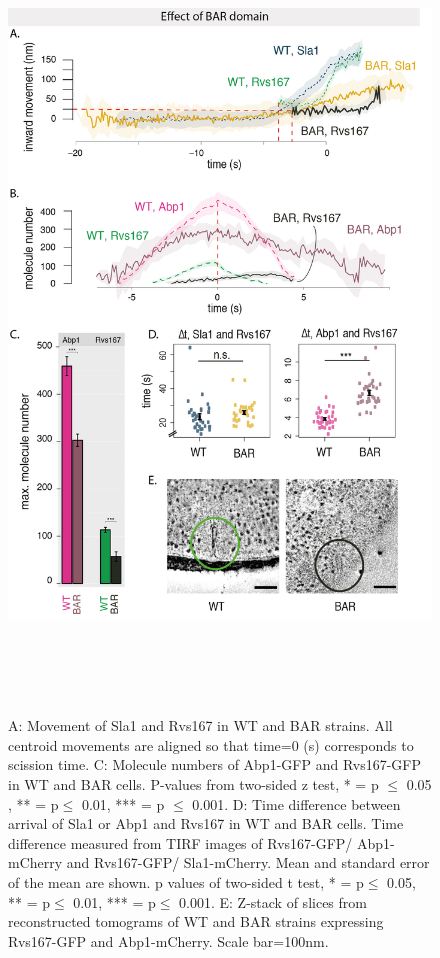 \begin{figure}
	\centering
	\includegraphics[width=21cm,height=21cm,keepaspectratio]{figures/results_final/delsh3_8}
	\caption [Tracking endocytic proteins in BAR cells]
	{A: Movement of Sla1 and Rvs167 in WT and BAR strains. All centroid movements are aligned so that time=0 (s) corresponds to scission time. 
	C: Molecule numbers of Abp1-GFP and Rvs167-GFP in WT and BAR cells. P-values from two-sided z test, * = p $\leq$ 0.05 , ** = p$\leq$ 0.01, *** = p $\leq$ 0.001. 
	D: Time difference between arrival of Sla1 or Abp1 and Rvs167  in WT and BAR cells. Time difference measured from TIRF images of  Rvs167-GFP/ Abp1-mCherry and Rvs167-GFP/ Sla1-mCherry. Mean and standard error of the mean are shown. p values of two-sided t test,  * = p$\leq$ 0.05, ** = p$\leq$ 0.01, *** = p$\leq$ 0.001. 
	E: Z-stack of slices from reconstructed tomograms of WT and BAR strains expressing Rvs167-GFP and Abp1-mCherry.  Scale bar=100nm.
	\label{fig2_sh3del}}

	\end{figure}
	\vspace{5mm}
	
